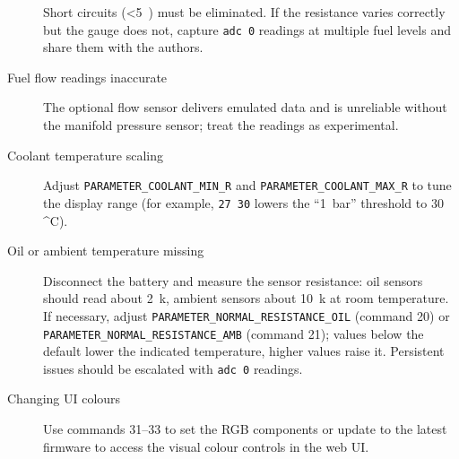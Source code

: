 \begin{description}
          Short circuits (<5~\ohm{}) must be eliminated.
          If the resistance varies correctly but the gauge does not, capture \verb|adc 0| readings at multiple fuel levels and share them with the authors.
    \item[Fuel flow readings inaccurate] The optional flow sensor delivers emulated data and is unreliable without the manifold pressure sensor; treat the readings as experimental.
    \item[Coolant temperature scaling] Adjust \texttt{PARAMETER\_COOLANT\_MIN\_R} and \texttt{PARAMETER\_COOLANT\_MAX\_R} to tune the display range (for example, \verb|27 30| lowers the ``1~bar'' threshold to 30~\,^{\circ}C).
    \item[Oil or ambient temperature missing] Disconnect the battery and measure the sensor resistance: oil sensors should read about 2~k\ohm{}, ambient sensors about 10~k\ohm{} at room temperature.
          If necessary, adjust \texttt{PARAMETER\_NORMAL\_RESISTANCE\_OIL} (command 20) or \texttt{PARAMETER\_NORMAL\_RESISTANCE\_AMB} (command 21); values below the default lower the indicated temperature, higher values raise it.
          Persistent issues should be escalated with \verb|adc 0| readings.
    \item[Changing UI colours] Use commands 31--33 to set the RGB components or update to the latest firmware to access the visual colour controls in the web UI.
\end{description}
